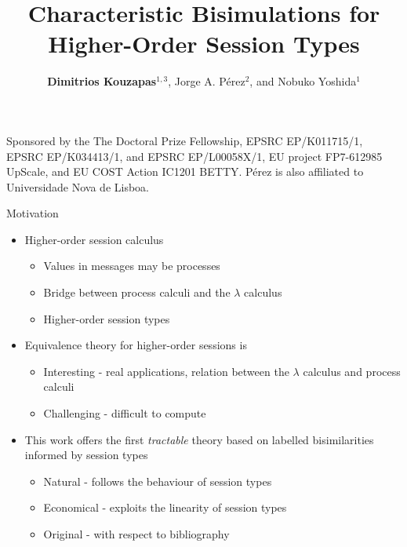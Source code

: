 \documentclass{beamer}
\title{Characteristic Bisimulations for Higher-Order Session Types}
\author{{\bf Dimitrios Kouzapas$^{1,3}$}, Jorge A. P\'{e}rez$^{2}$, and Nobuko Yoshida$^1$}
\institute{Imperial College London$^1$, University of Groningen$^2$, University of Glasgow$^3$}
\date
\begin{document}
	\begin{frame}
		\titlepage

		{ \tiny %
		Sponsored by the The Doctoral Prize Fellowship, EPSRC EP/K011715/1,
		EPSRC EP/K034413/1, and EPSRC EP/L00058X/1,
		EU project FP7-612985 UpScale, and EU COST Action IC1201 BETTY.  
		P\'{e}rez is  also affiliated to
		Universidade Nova de Lisboa.%
		}
	\end{frame}

	\begin{frame}{Motivation}
		\begin{itemize}
			\item	Higher-order session calculus

				\begin{itemize}
					\item	Values in messages may be processes
					\item	Bridge between process calculi and the $\lambda$ calculus
					\item	Higher-order session types
				\end{itemize}


			\item	Equivalence theory for higher-order sessions is
				\begin{itemize}
					\item	Interesting - real applications, relation between the $\lambda$ calculus and process calculi
					\item	Challenging - difficult to compute
				\end{itemize}

			\item	This work offers the first {\em tractable} theory based on labelled bisimilarities
				informed by session types %
				\begin{itemize}
					\item	Natural - follows the behaviour of session types
					\item	Economical - exploits the linearity of session types
					\item	Original - with respect to bibliography
				\end{itemize}
		\end{itemize}
	\end{frame}
\end{document}
